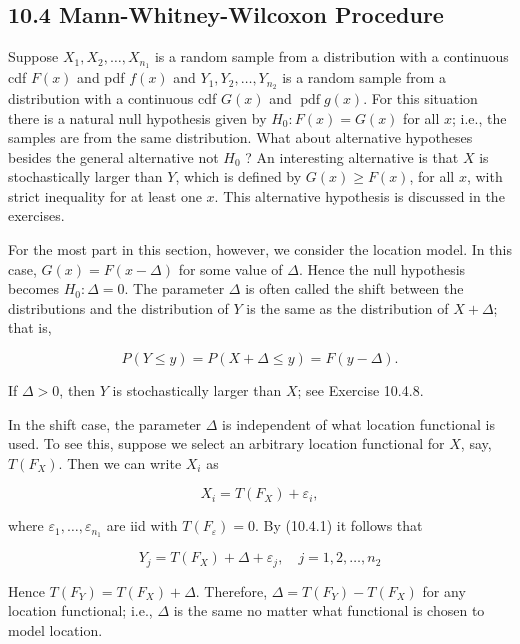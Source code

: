 \subsection*{10.4 Mann-Whitney-Wilcoxon Procedure}
Suppose $X_{1}, X_{2}, \ldots, X_{n_{1}}$ is a random sample from a distribution with a continuous cdf $F(x)$ and pdf $f(x)$ and $Y_{1}, Y_{2}, \ldots, Y_{n_{2}}$ is a random sample from a distribution with a continuous cdf $G(x)$ and $\operatorname{pdf} g(x)$. For this situation there is a natural null hypothesis given by $H_{0}: F(x)=G(x)$ for all $x$; i.e., the samples are from the same distribution. What about alternative hypotheses besides the general alternative not $H_{0}$ ? An interesting alternative is that $X$ is stochastically larger than $Y$, which is defined by $G(x) \geq F(x)$, for all $x$, with strict inequality for at least one $x$. This alternative hypothesis is discussed in the exercises.

For the most part in this section, however, we consider the location model. In this case, $G(x)=F(x-\Delta)$ for some value of $\Delta$. Hence the null hypothesis becomes $H_{0}: \Delta=0$. The parameter $\Delta$ is often called the shift between the distributions and the distribution of $Y$ is the same as the distribution of $X+\Delta$; that is,


\begin{equation*}
P(Y \leq y)=P(X+\Delta \leq y)=F(y-\Delta) . \tag{10.4.1}
\end{equation*}


If $\Delta>0$, then $Y$ is stochastically larger than $X$; see Exercise 10.4.8.

In the shift case, the parameter $\Delta$ is independent of what location functional is used. To see this, suppose we select an arbitrary location functional for $X$, say, $T\left(F_{X}\right)$. Then we can write $X_{i}$ as


\begin{equation*}
X_{i}=T\left(F_{X}\right)+\varepsilon_{i}, \tag{10.4.2}
\end{equation*}


where $\varepsilon_{1}, \ldots, \varepsilon_{n_{1}}$ are iid with $T\left(F_{\varepsilon}\right)=0$. By (10.4.1) it follows that


\begin{equation*}
Y_{j}=T\left(F_{X}\right)+\Delta+\varepsilon_{j}, \quad j=1,2, \ldots, n_{2} \tag{10.4.3}
\end{equation*}


Hence $T\left(F_{Y}\right)=T\left(F_{X}\right)+\Delta$. Therefore, $\Delta=T\left(F_{Y}\right)-T\left(F_{X}\right)$ for any location functional; i.e., $\Delta$ is the same no matter what functional is chosen to model location.

